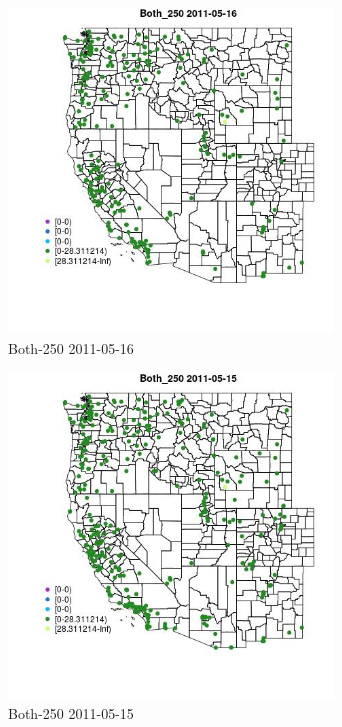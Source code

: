 \clearpage 

\begin{figure} 
\centering  
\includegraphics[width=0.77\textwidth]{Code_Outputs/ML_input_report_ML_input_PM25_Step5_part_d_de_duplicated_aves_ML_input_MapObsBoth_2502011-05-16.jpg} 
\caption{\label{fig:ML_input_report_ML_input_PM25_Step5_part_d_de_duplicated_aves_ML_inputMapObsBoth_2502011-05-16}Both-250 2011-05-16} 
\end{figure} 
 

\begin{figure} 
\centering  
\includegraphics[width=0.77\textwidth]{Code_Outputs/ML_input_report_ML_input_PM25_Step5_part_d_de_duplicated_aves_ML_input_MapObsBoth_2502011-05-15.jpg} 
\caption{\label{fig:ML_input_report_ML_input_PM25_Step5_part_d_de_duplicated_aves_ML_inputMapObsBoth_2502011-05-15}Both-250 2011-05-15} 
\end{figure} 
 

